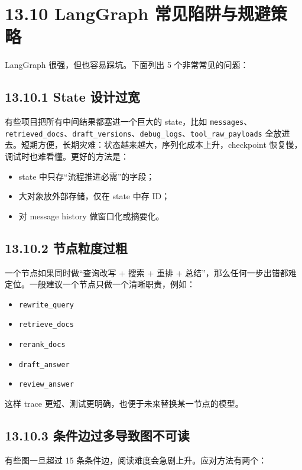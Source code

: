 \section{13.10 LangGraph 常见陷阱与规避策略}

LangGraph 很强，但也容易踩坑。下面列出 5 个非常常见的问题：


\subsection{13.10.1 State 设计过宽}

有些项目把所有中间结果都塞进一个巨大的 state，比如 \texttt{messages}、\texttt{retrieved\_docs}、\texttt{draft\_versions}、\texttt{debug\_logs}、\texttt{tool\_raw\_payloads} 全放进去。短期方便，长期灾难：状态越来越大，序列化成本上升，checkpoint 恢复慢，调试时也难看懂。更好的方法是：


\begin{itemize}[leftmargin=2em]
\item state 中只存``流程推进必需''的字段；
\item 大对象放外部存储，仅在 state 中存 ID；
\item 对 message history 做窗口化或摘要化。
\end{itemize}

\subsection{13.10.2 节点粒度过粗}

一个节点如果同时做``查询改写 + 搜索 + 重排 + 总结''，那么任何一步出错都难定位。一般建议一个节点只做一个清晰职责，例如：


\begin{itemize}[leftmargin=2em]
\item \texttt{rewrite\_query}
\item \texttt{retrieve\_docs}
\item \texttt{rerank\_docs}
\item \texttt{draft\_answer}
\item \texttt{review\_answer}
\end{itemize}

这样 trace 更短、测试更明确，也便于未来替换某一节点的模型。


\subsection{13.10.3 条件边过多导致图不可读}

有些图一旦超过 15 条条件边，阅读难度会急剧上升。应对方法有两个：



